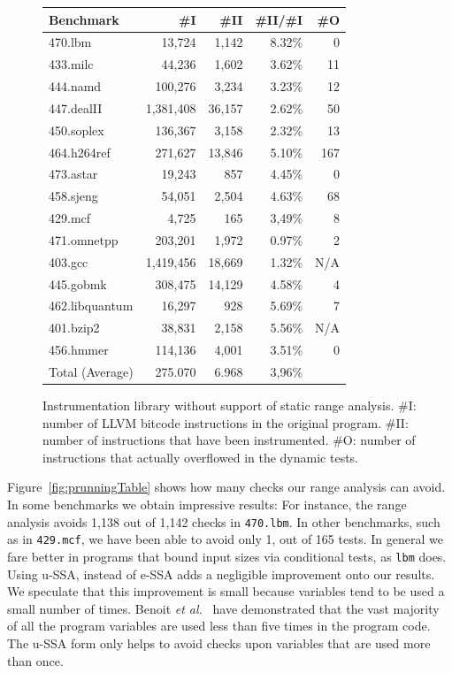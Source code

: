 \documentclass[preprint]{sigplanconf}[10pt]
\begin{document}
\begin{figure}[htb]
\begin{center}
\begin{small}
\begin{tabular*}{\columnwidth}{@{\extracolsep{\fill}}|l|r|r|r|r|}
\hline
Benchmark & \#I & \#II & \#II/\#I & \#O \\ \hline
470.lbm & 13,724 & 1,142 & 8.32\% & 0 \\ \hline
433.milc & 44,236 & 1,602 & 3.62\% & 11 \\ \hline
444.namd & 100,276 & 3,234 & 3.23\% & 12 \\ \hline
447.dealII & 1,381,408 & 36,157 & 2.62\% & 50 \\ \hline
450.soplex & 136,367 & 3,158 & 2.32\% & 13 \\ \hline
464.h264ref & 271,627 & 13,846 & 5.10\% & 167 \\ \hline
473.astar & 19,243 & 857 & 4.45\% & 0 \\ \hline
458.sjeng & 54,051 & 2,504 & 4.63\% & 68 \\ \hline
429.mcf & 4,725 & 165 & 3,49\% & 8 \\ \hline
471.omnetpp & 203,201 & 1,972 & 0.97\% & 2 \\ \hline
403.gcc & 1,419,456 & 18,669 & 1.32\% & N/A \\ \hline
445.gobmk & 308,475 & 14,129 & 4.58\% & 4 \\ \hline
462.libquantum & 16,297 & 928 & 5.69\% & 7 \\ \hline
401.bzip2 & 38,831 & 2,158 & 5.56\% & N/A \\ \hline
456.hmmer & 114,136 & 4,001 & 3.51\% & 0 \\ \hline
\multicolumn{1}{|r|}{Total (Average)} & 275.070 & 6.968 & 3,96\% &  \\ \hline
\end{tabular*}
\end{small}
\end{center}
\caption{\label{fig:unprunedTable}
Instrumentation library without support of static range analysis.
\#I: number of LLVM bitcode instructions in the original program.
\#II: number of instructions that have been instrumented.
\#O: number of instructions that actually overflowed in the dynamic tests.}
\end{figure}

Figure~\ref{fig:prunningTable} shows how many checks our range analysis
can avoid.
In some benchmarks we obtain impressive results:
For instance, the range analysis avoids 1,138 out of 1,142 checks in
\texttt{470.lbm}.
In other benchmarks, such as in \texttt{429.mcf}, we have been able to
avoid only 1, out of 165 tests.
In general we fare better in programs that bound input sizes via conditional
tests, as \texttt{lbm} does.
Using u-SSA, instead of e-SSA adds a negligible improvement onto our results.
We speculate that this improvement is small because variables tend to be used
a small number of times.
Benoit {\em et al.}~\cite{Benoit08} have demonstrated that the vast majority
of all the program variables are used less than five times in the program
code.
The u-SSA form only helps to avoid checks upon variables that are used more
than once.
\end{document}
